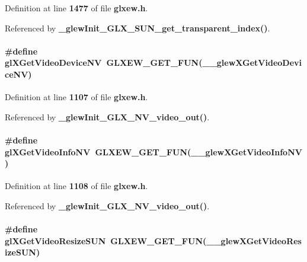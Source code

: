Definition at line {\bf 1477} of file {\bf glxew.\+h}.



Referenced by {\bf \+\_\+glew\+Init\+\_\+\+G\+L\+X\+\_\+\+S\+U\+N\+\_\+get\+\_\+transparent\+\_\+index()}.

\paragraph[{gl\+X\+Get\+Video\+Device\+NV}]{\setlength{\rightskip}{0pt plus 5cm}\#define gl\+X\+Get\+Video\+Device\+NV~{\bf G\+L\+X\+E\+W\+\_\+\+G\+E\+T\+\_\+\+F\+UN}({\bf \+\_\+\+\_\+glew\+X\+Get\+Video\+Device\+NV})}\label{glxew_8h_ab3eee6cb75ceb44bd87422cf86c33c3b}


Definition at line {\bf 1107} of file {\bf glxew.\+h}.



Referenced by {\bf \+\_\+glew\+Init\+\_\+\+G\+L\+X\+\_\+\+N\+V\+\_\+video\+\_\+out()}.

\paragraph[{gl\+X\+Get\+Video\+Info\+NV}]{\setlength{\rightskip}{0pt plus 5cm}\#define gl\+X\+Get\+Video\+Info\+NV~{\bf G\+L\+X\+E\+W\+\_\+\+G\+E\+T\+\_\+\+F\+UN}({\bf \+\_\+\+\_\+glew\+X\+Get\+Video\+Info\+NV})}\label{glxew_8h_aa4fd4aee58a3a28d5f58c64f8bb909b5}


Definition at line {\bf 1108} of file {\bf glxew.\+h}.



Referenced by {\bf \+\_\+glew\+Init\+\_\+\+G\+L\+X\+\_\+\+N\+V\+\_\+video\+\_\+out()}.

\paragraph[{gl\+X\+Get\+Video\+Resize\+S\+UN}]{\setlength{\rightskip}{0pt plus 5cm}\#define gl\+X\+Get\+Video\+Resize\+S\+UN~{\bf G\+L\+X\+E\+W\+\_\+\+G\+E\+T\+\_\+\+F\+UN}({\bf \+\_\+\+\_\+glew\+X\+Get\+Video\+Resize\+S\+UN})}\label{glxew_8h_abfa62bcdbc8976c3515b41418e41b700}


